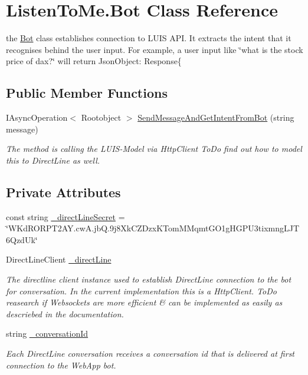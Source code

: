 \hypertarget{class_listen_to_me_1_1_bot}{}\section{Listen\+To\+Me.\+Bot Class Reference}
\label{class_listen_to_me_1_1_bot}


the \hyperlink{class_listen_to_me_1_1_bot}{Bot} class establishes connection to L\+U\+IS A\+PI. It extracts the intent that it recognises behind the user input. For example, a user input like \char`\"{}what is the stock price of dax?\char`\"{} will return Json\+Object\+: Response\{  


\subsection*{Public Member Functions}
\begin{DoxyCompactItemize}
\item 
I\+Async\+Operation$<$ Rootobject $>$ \hyperlink{class_listen_to_me_1_1_bot_a3730a1ccd4cbf3233cde6fe324c9c11e}{Send\+Message\+And\+Get\+Intent\+From\+Bot} (string message)
\begin{DoxyCompactList}\small\item\em The method is calling the L\+U\+I\+S-\/\+Model via Http\+Client To\+Do find out how to model this to Direct\+Line as well. \end{DoxyCompactList}\end{DoxyCompactItemize}
\subsection*{Private Attributes}
\begin{DoxyCompactItemize}
\item 
const string \hyperlink{class_listen_to_me_1_1_bot_a3f7fa2c3cbea4ec11f5a75e2e8c9c72d}{\+\_\+direct\+Line\+Secret} = \char`\"{}W\+Kd\+R\+O\+R\+P\+T2\+A\+Y.\+cw\+A.\+jb\+Q.\+9j8\+Xk\+C\+Z\+Dzx\+K\+Tom\+M\+Mqmt\+G\+O1g\+H\+G\+P\+U3tixmng\+L\+J\+T6\+Qzd\+Uk\char`\"{}
\item 
Direct\+Line\+Client \hyperlink{class_listen_to_me_1_1_bot_a964ea223816ac25f4ccf8357edb2f5ad}{\+\_\+direct\+Line}
\begin{DoxyCompactList}\small\item\em The directline client instance used to establish Direct\+Line connection to the bot for conversation. In the current implementation this is a Http\+Client. To\+Do reasearch if Websockets are more efficient \& can be implemented as easily as descriebed in the documentation. \end{DoxyCompactList}\item 
string \hyperlink{class_listen_to_me_1_1_bot_a2537a949a0ae2f9adab1e080ad2a9c3a}{\+\_\+conversation\+Id}
\begin{DoxyCompactList}\small\item\em Each Direct\+Line conversation receives a conversation id that is delivered at first connection to the Web\+App bot. \end{DoxyCompactList}\end{DoxyCompactItemize}
